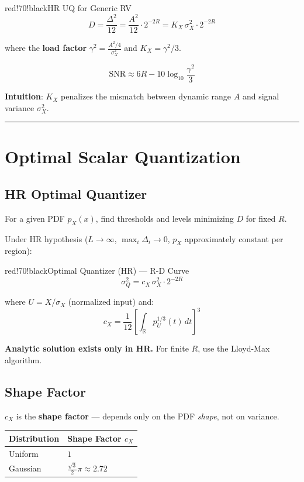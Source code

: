 \begin{calloutbox}{red!70!black}{HR UQ for Generic RV}
\[
D = \frac{\Delta^2}{12} = \frac{A^2}{12}\cdot 2^{-2R} = K_X\,\sigma_X^2\cdot 2^{-2R}
\]

where the \textbf{load factor} $\gamma^2 = \frac{A^2/4}{\sigma_X^2}$ and $K_X = \gamma^2/3$.

\[
\mathrm{SNR} \approx 6R - 10\log_{10}\frac{\gamma^2}{3}
\]

\textbf{Intuition}: $K_X$ penalizes the mismatch between dynamic range $A$ and signal variance $\sigma_X^2$.
\end{calloutbox}

\bigskip\hrule\bigskip

\section{Optimal Scalar Quantization}

\subsection{HR Optimal Quantizer}

For a given PDF $p_X(x)$, find thresholds and levels minimizing $D$ for fixed $R$.

Under HR hypothesis ($L\to\infty$, $\max_i\Delta_i\to0$, $p_X$ approximately constant per region):

\begin{calloutbox}{red!70!black}{Optimal Quantizer (HR) — R-D Curve}
\[
\sigma_Q^2 = c_X\,\sigma_X^2\cdot 2^{-2R}
\]

where $U = X/\sigma_X$ (normalized input) and:
\[
c_X = \frac{1}{12}\left[\int_{\mathbb{R}} p_U^{1/3}(t)\,dt\right]^3
\]

\textbf{Analytic solution exists only in HR.} For finite $R$, use the Lloyd-Max algorithm.
\end{calloutbox}

\subsection{Shape Factor}

$c_X$ is the \textbf{shape factor} — depends only on the PDF \textit{shape}, not on variance.

\begin{center}
\begin{tabular}{|l|l|}
\hline
\textbf{Distribution} & \textbf{Shape Factor $c_X$} \\ \hline
Uniform & $1$ \\ \hline
Gaussian & $\frac{\sqrt{3}}{2}\pi \approx 2.72$ \\ \hline
\end{tabular}
\end{center}

